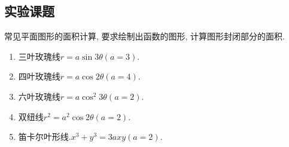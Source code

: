 \documentclass[a4paper,12pt]{article}
\begin{document}
\begin{CJK*}{UTF8}{gbsn}



\section{实验课题}
常见平面图形的面积计算, 要求绘制出函数的图形, 计算图形封闭部分的面积.
\begin{enumerate}
\item 三叶玫瑰线$r=a\sin{3\theta}(a=3)$.
\item 四叶玫瑰线$r=a\cos{2\theta}(a=4)$.
\item 六叶玫瑰线$r=a\cos^2{3\theta}(a=2)$.
\item 双纽线$r^2=a^2\cos{2\theta}(a=2)$.
\item 笛卡尔叶形线.$x^3+y^3=3axy(a=2)$.
\end{enumerate}




\end{CJK*}
\end{document}
